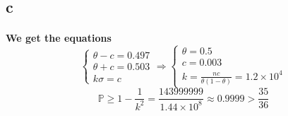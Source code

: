 \documentclass{article}
\begin{document}
        \subsection*{c}
        \paragraph{
            We get the equations
            \begin{equation*}
                \begin{cases}
                   \theta-c=0.497\\
                   \theta+c=0.503\\
                    k\sigma=c
                \end{cases}
                \Rightarrow
                \begin{cases}
                   \theta=0.5\\
                    c=0.003\\
                    k=\frac{nc}{\theta(1-\theta)}=1.2\times10^4
                \end{cases}
            \end{equation*}
            $$\mathbb{P}\geq 1-\frac{1}{k^2}=\frac{143999999}{1.44\times10^8}\approx 0.9999>\frac{35}{36}$$
        }

    \section{}
\end{document}
